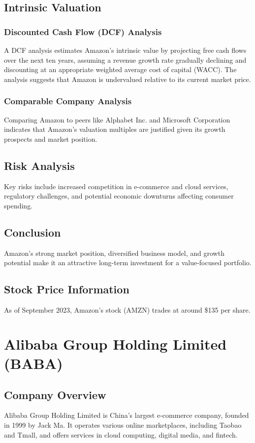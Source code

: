 \documentclass[12pt]{report}
\begin{document}
\section{Intrinsic Valuation}
\subsection{Discounted Cash Flow (DCF) Analysis}
A DCF analysis estimates Amazon's intrinsic value by projecting free cash flows over the next ten years, assuming a revenue growth rate gradually declining and discounting at an appropriate weighted average cost of capital (WACC). The analysis suggests that Amazon is undervalued relative to its current market price.

\subsection{Comparable Company Analysis}
Comparing Amazon to peers like Alphabet Inc. and Microsoft Corporation indicates that Amazon's valuation multiples are justified given its growth prospects and market position.

\section{Risk Analysis}
Key risks include increased competition in e-commerce and cloud services, regulatory challenges, and potential economic downturns affecting consumer spending.

\section{Conclusion}
Amazon's strong market position, diversified business model, and growth potential make it an attractive long-term investment for a value-focused portfolio.

\section{Stock Price Information}
As of September 2023, Amazon's stock (AMZN) trades at around \$135 per share.

\chapter{Alibaba Group Holding Limited (BABA)}
\section{Company Overview}
Alibaba Group Holding Limited is China's largest e-commerce company, founded in 1999 by Jack Ma. It operates various online marketplaces, including Taobao and Tmall, and offers services in cloud computing, digital media, and fintech.
\end{document}
